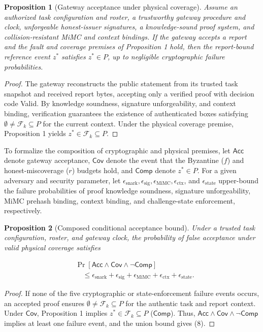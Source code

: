 \documentclass[pdflatex,iicol,sn-mathphys-num]{sn-jnl}
\theoremstyle{thmstyleone}
\newtheorem{proposition}{Proposition}
\begin{document}
\begin{proposition}[Gateway acceptance under physical coverage]\label{prop:gateway}
Assume an authorized task configuration and roster, a trustworthy gateway procedure and clock, unforgeable honest-issuer signatures, a knowledge-sound proof system, and collision-resistant MiMC and context bindings. If the gateway accepts a report and the fault and coverage premises of Proposition 1 hold, then the report-bound reference event $z^*$ satisfies $z^* \in P$, up to negligible cryptographic failure probabilities.
\end{proposition}
\begin{proof}
The gateway reconstructs the public statement from its trusted task snapshot and received report bytes, accepting only a verified proof with decision code Valid. By knowledge soundness, signature unforgeability, and context binding, verification guarantees the existence of authenticated boxes satisfying $\emptyset \neq \mathcal{F}_k \subseteq P$ for the current context. Under the physical coverage premise, Proposition 1 yields $z^* \in \mathcal{F}_k \subseteq P$.
\end{proof}

To formalize the composition of cryptographic and physical premises, let $\mathsf{Acc}$ denote gateway acceptance, $\mathsf{Cov}$ denote the event that the Byzantine ($f$) and honest-miscoverage ($r$) budgets hold, and $\mathsf{Comp}$ denote $z^* \in P$. For a given adversary and security parameter, let $\epsilon_{\mathrm{snark}}, \epsilon_{\mathrm{sig}}, \epsilon_{\mathrm{MiMC}}, \epsilon_{\mathrm{ctx}}$, and $\epsilon_{\mathrm{state}}$ upper-bound the failure probabilities of proof knowledge soundness, signature unforgeability, MiMC prehash binding, context binding, and challenge-state enforcement, respectively.

\begin{proposition}[Composed conditional acceptance bound]\label{prop:composition}
Under a trusted task configuration, roster, and gateway clock, the probability of false acceptance under valid physical coverage satisfies

\begin{equation}\label{eq:composed}
\begin{split}
&\Pr[\mathsf{Acc} \wedge \mathsf{Cov} \wedge \neg\mathsf{Comp}] \\
&\quad\le \epsilon_{\mathrm{snark}} + \epsilon_{\mathrm{sig}} + \epsilon_{\mathrm{MiMC}} + \epsilon_{\mathrm{ctx}} + \epsilon_{\mathrm{state}}.
\end{split}
\end{equation}
\end{proposition}
\begin{proof}
If none of the five cryptographic or state-enforcement failure events occurs, an accepted proof ensures $\emptyset \neq \mathcal{F}_k \subseteq P$ for the authentic task and report context. Under $\mathsf{Cov}$, Proposition 1 implies $z^* \in \mathcal{F}_k \subseteq P$ ($\mathsf{Comp}$). Thus, $\mathsf{Acc} \wedge \mathsf{Cov} \wedge \neg\mathsf{Comp}$ implies at least one failure event, and the union bound gives (8).
\end{proof}
\end{document}
